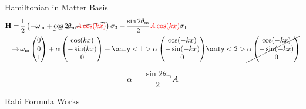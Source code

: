 \documentclass[9pt]{beamer}
\begin{document}
\begin{darkframes}
\begin{frame}{Hamiltonian in Matter Basis}
\begin{align*}
    \mathbf {H} =\,& \frac{1}{2}\left( - \omega_{\mathrm{m}}
    +\cancel{
     \cos 2\theta_{\mathrm{m}}{\color{red}A\cos(kx)} } \right) \sigma_3 - \frac{  \sin 2\theta_{\mathrm{m}
    }
    }{2}{\color{red}A \cos(kx)}  \sigma_1 \\
    \to\, &  \omega_{\mathrm m}\begin{pmatrix}
    0\\
    0\\
    1
    \end{pmatrix} + \alpha \begin{pmatrix}
    \cos (kx)\\
    -\sin(k x)\\
    0
    \end{pmatrix}  + \only<1>{\alpha \begin{pmatrix}
    \cos (-kx)\\
    -\sin( - k x)\\
    0
    \end{pmatrix}
    }
    \only<2>{\cancel{\alpha \begin{pmatrix}
    \cos (-kx)\\
    -\sin( - k x)\\
    0
    \end{pmatrix}
    }
    }
\end{align*}

\begin{equation*}
\alpha = \frac{\sin2\theta_{\mathrm m}}{2}A
\end{equation*}







\end{frame}



\begin{frame}{Rabi Formula Works}




\end{frame}
\end{darkframes}
\end{document}
